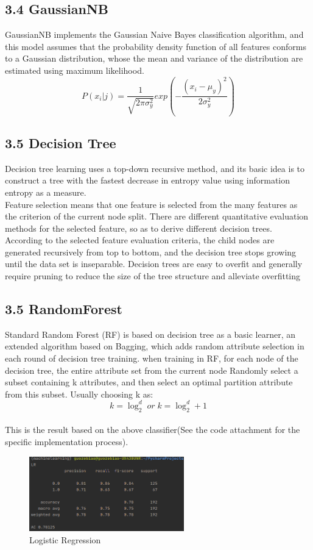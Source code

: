 \documentclass[11pt]{article}
\begin{document}
\subsection{3.4 GaussianNB}
GaussianNB implements the Gaussian Naive Bayes classification algorithm, and this model assumes that the probability density function of all features conforms to a Gaussian distribution, whose the mean and variance of the distribution are estimated using maximum likelihood.
\[
P(x_i\lvert j) = \frac{1}{\sqrt{2\pi \sigma^2_y}} exp(- \frac{(x_i-\mu_y)^2}{2\sigma^2_y})
\]

\subsection{3.5 Decision Tree}
Decision tree learning uses a top-down recursive method, and its basic idea is to construct a tree with the fastest decrease in entropy value using information entropy as a measure.\\
Feature selection means that one feature is selected from the many features as the criterion of the current node split. There are different quantitative evaluation methods for the selected feature, so as to derive different decision trees. According to the selected feature evaluation criteria, the child nodes are generated recursively from top to bottom, and the decision tree stops growing until the data set is inseparable. Decision trees are easy to overfit and generally require pruning to reduce the size of the tree structure and alleviate overfitting

\subsection{3.5 RandomForest}
Standard Random Forest (RF) is based on decision tree as a basic learner, an extended algorithm based on Bagging, which adds random attribute selection in each round of decision tree training. 
when training in RF, for each node of the decision tree, the entire attribute set from the current node 
Randomly select a subset containing k attributes, and then select an optimal partition attribute from this subset. Usually choosing k as:
\[
k = \log^d_2 \;or\; k = \log^d_2 + 1
\]\\

This is the result based on the above classifier(See the code attachment for the specific implementation process).

\begin{figure}[H]
    \centering
    \includegraphics[width=0.6\textwidth]{lg}
    \caption{Logistic Regression}
\end{figure}
\end{document}
